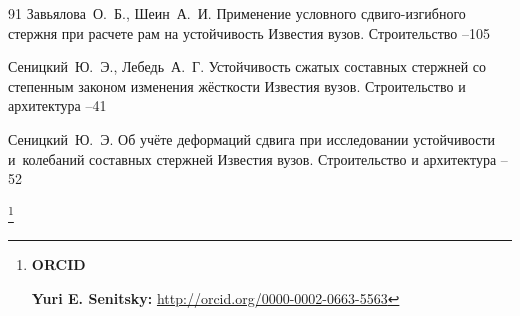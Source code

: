 \begin{thebibliography}{91}
\by Завьялова~О.~Б., Шеин~А.~И.
\paper Применение условного сдвиго-изгибного стержня при расчете рам на устойчивость
\jour  Известия вузов. Строительство
--105

\by Сеницкий~Ю.~Э., Лебедь~А.~Г.
\paper Устойчивость сжатых составных стержней со степенным законом изменения жёсткости
\jour Известия вузов. Строительство и архитектура
--41

\by Сеницкий~Ю.~Э.
 \paper Об учёте деформаций сдвига при исследовании устойчивости и~колебаний составных стержней
  \jour  Известия вузов. Строительство и архитектура
  --52
  

\end{thebibliography}

\RuDate


\makeentitle


\thanks{{\bf ORCID}

{\bf Yuri E. Senitsky:} \url{http://orcid.org/0000-0002-0663-5563}



}


\EngRef


